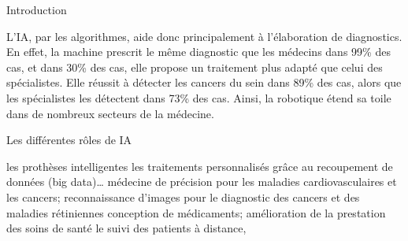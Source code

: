 \begin{frame}{Introduction}
    \begin{enumerate}[<+-|alert@+>]
        \myitem L'IA, par les algorithmes, aide donc principalement à l'élaboration de
                diagnostics.
        \myitem En effet, la machine prescrit le même diagnostic que les
                médecins dans 99\% des cas, et dans 30\% des cas, elle propose un
                traitement plus adapté que celui des spécialistes. Elle réussit à
                détecter les cancers du sein dans 89\% des cas, alors que les
                spécialistes les détectent dans 73\% des cas.
        \myitem Ainsi, la robotique étend sa toile dans de nombreux secteurs de
            la médecine.
    \end{enumerate}
\end{frame}

\begin{frame}{Les différentes rôles de IA}
    \begin{enumerate}[<+-|alert@+>]
        \myitem les prothèses intelligentes
        \myitem les traitements personnalisés grâce au recoupement de données (big data)… 
        \myitem médecine de précision pour les maladies cardiovasculaires et les cancers;
        \myitem reconnaissance d'images pour le diagnostic des cancers et des maladies rétiniennes conception de médicaments;
        \myitem amélioration de la prestation des soins de santé
        \myitem le suivi des patients à distance,
    \end{enumerate}
    \vspace{80mm}
\end{frame}


